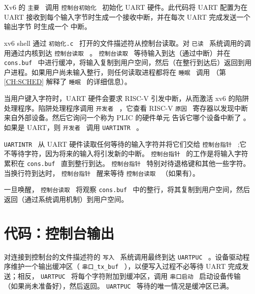 \documentclass[UTF8]{article}
\begin{document}
Xv6 的  {    \tt    主要   }  调用  {    \tt    控制台初始化   } 
        初始化 UART 硬件。此代码将 UART 配置为在 UART 接收到每个输入字节时生成一个接收中断，并在每次 UART 完成发送一个输出字节        时生成一个        中断。  

xv6 shell 通过  {    \tt    初始化.c   }         打开的文件描述符从控制台读取。对  {    \tt    已读   }  系统调用的调用通过内核到达  {    \tt    控制台读取   }         。  {    \tt    控制台读取   }  等待输入到达（通过中断）并在  {    \tt    cons.buf   }  中进行缓冲，将输入复制到用户空间，然后（在整行到达后）返回到用户进程。如果用户尚未输入整行，则任何读取进程都将在
  {    \tt    睡眠   }  调用
        （第 ~    \ref{CH:SCHED}    解释了  {    \tt    睡眠   }  的详细信息）。  

当用户键入字符时，UART 硬件会要求 RISC-V 引发中断，从而激活 xv6 的陷阱处理程序。陷阱处理程序调用  {    \tt    开发者   } 
        ，它查看 RISC-V  {    \tt   原因   }  寄存器以发现中断来自外部设备。然后它询问一个称为 PLIC 的硬件单元
    \cite{riscv:priv}    告诉它哪个设备中断了
        。如果是 UART，则  {    \tt    开发者   }  调用  {    \tt    UARTINTR   }  。  

 {    \tt    UARTINTR   } 
        从 UART 硬件读取任何等待的输入字符并将它们交给  {    \tt    控制台指针   } 
       ;它不等待字符，因为将来的输入将引发新的中断。  {    \tt    控制台指针   }  的工作是将输入字符累积在
  {    \tt    cons.buf   }  直到整行到达。
  {    \tt    控制台指针   }  特别对待退格键和其他一些字符。当换行符到达时， {    \tt    控制台指针   }  醒来等待  {    \tt    控制台读取   } （如果有）。  

一旦唤醒，  {    \tt    控制台读取   }  将观察  {    \tt    cons.buf   }  中的整行，将其复制到用户空间，然后返回（通过系统调用机制）到用户空间。  

   \section{代码：控制台输出  }     

对连接到控制台的文件描述符的  {    \tt    写入   }  系统调用最终到达
  {    \tt    UARTPUC   } 
        。设备驱动程序维护一个输出缓冲区（  {    \tt    串口\_tx\_buf   }  ），以便写入过程不必等待 UART 完成发送；相反， {    \tt    UARTPUC   }  将每个字符附加到缓冲区，调用  {    \tt    串口启动   }  启动设备传输（如果尚未准备好），然后返回。  {    \tt    UARTPUC   }  等待的唯一情况是缓冲区已满。  
\end{document}
